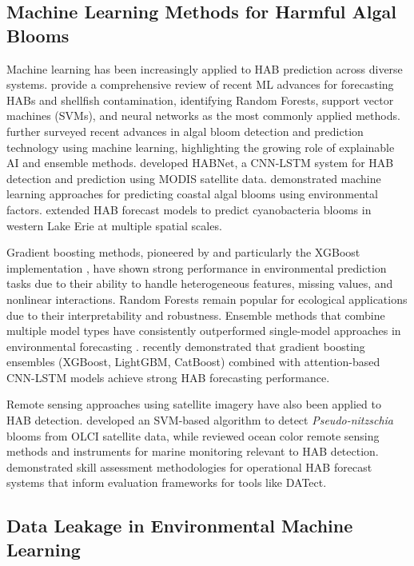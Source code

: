 \documentclass[preprint,12pt,authoryear]{elsarticle}
\begin{document}
\subsection{Machine Learning Methods for Harmful Algal Blooms}
\label{sec:rw-ml-habs}

Machine learning has been increasingly applied to HAB prediction across diverse systems. \citet{Cruz2021} provide a comprehensive review of recent ML advances for forecasting HABs and shellfish contamination, identifying Random Forests, support vector machines (SVMs), and neural networks as the most commonly applied methods. \citet{Shin2024} further surveyed recent advances in algal bloom detection and prediction technology using machine learning, highlighting the growing role of explainable AI and ensemble methods. \citet{Hill2020} developed HABNet, a CNN-LSTM system for HAB detection and prediction using MODIS satellite data. \citet{Yu2021} demonstrated machine learning approaches for predicting coastal algal blooms using environmental factors. \citet{Manning2019} extended HAB forecast models to predict cyanobacteria blooms in western Lake Erie at multiple spatial scales.

Gradient boosting methods, pioneered by \citet{Friedman2001} and particularly the XGBoost implementation \citep{Chen2016}, have shown strong performance in environmental prediction tasks due to their ability to handle heterogeneous features, missing values, and nonlinear interactions. Random Forests \citep{Breiman2001} remain popular for ecological applications due to their interpretability and robustness. Ensemble methods that combine multiple model types have consistently outperformed single-model approaches in environmental forecasting \citep{Dietterich2000}. \citet{Ahn2023} recently demonstrated that gradient boosting ensembles (XGBoost, LightGBM, CatBoost) combined with attention-based CNN-LSTM models achieve strong HAB forecasting performance.

Remote sensing approaches using satellite imagery have also been applied to HAB detection. \citet{GonzalezVilas2024} developed an SVM-based algorithm to detect \textit{Pseudo-nitzschia} blooms from OLCI satellite data, while \citet{BlondeauPatissier2014} reviewed ocean color remote sensing methods and instruments for marine monitoring relevant to HAB detection. \citet{Stumpf2009} demonstrated skill assessment methodologies for operational HAB forecast systems that inform evaluation frameworks for tools like DATect.

\subsection{Data Leakage in Environmental Machine Learning}
\label{sec:rw-leakage}
\end{document}
